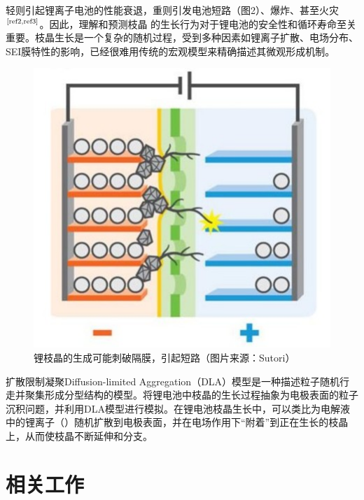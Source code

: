 \documentclass{article}
\begin{document}
\noindent 轻则引起锂离子电池的性能衰退，重则引发电池短路（图2）、爆炸、甚至火灾$^{\textup{\cite{ref2,ref3}}}$。因此，理解和预测枝晶
的生长行为对于锂电池的安全性和循环寿命至关重要。枝晶生长是一个复杂的随机过程，受到多种因素如锂离子扩散、电场分布、SEI膜特性的影响，已经很难用传统的宏观模型来精确描述其微观形成机制。\\
\begin{figure}[H]
 \centering
 \includegraphics[scale=0.8]{figs/3.jpg}
\caption{锂枝晶的生成可能刺破隔膜，引起短路（图片来源：Sutori）}
\end{figure}
扩散限制凝聚Diffusion-limited Aggregation（DLA）模型是一种描述粒子随机行走并聚集形成分型结构的模型。将锂电池中枝晶的生长过程抽象为电极表面的粒子沉积问题，并利用DLA模型进行模拟。在锂电池枝晶生长中，可以类比为电解液中的锂离子（）随机扩散到电极表面，并在电场作用下“附着”到正在生长的枝晶上，从而使枝晶不断延伸和分支。


\section{相关工作}
\end{document}
